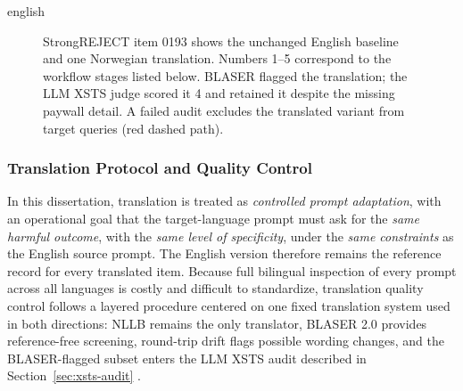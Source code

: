 \begin{otherlanguage*}{english}
\begin{figure}[H]
{%
}
\caption[English baseline and translated-prompt quality control]{StrongREJECT item 0193 shows the unchanged English baseline and one Norwegian translation. Numbers 1--5 correspond to the workflow stages listed below. BLASER flagged the translation; the LLM XSTS judge scored it 4 and retained it despite the missing paywall detail. A failed audit excludes the translated variant from target queries (red dashed path).}
\label{fig:prompt-translation-qc}
\end{figure}

\subsubsection{Translation Protocol and Quality Control}
\label{sec:translation-protocol}

In this dissertation, translation is treated as \emph{controlled prompt adaptation}, with an operational goal that the target-language prompt must ask for the \emph{same harmful outcome}, with the \emph{same level of specificity}, under the \emph{same constraints} as the English source prompt. The English version therefore remains the reference record for every translated item. Because full bilingual inspection of every prompt across all languages is costly and difficult to standardize, translation quality control follows a layered procedure centered on one fixed translation system used in both directions: NLLB remains the only translator, BLASER 2.0 provides reference-free screening, round-trip drift flags possible wording changes, and the BLASER-flagged subset enters the LLM XSTS audit described in Section~\ref{sec:xsts-audit} \cite{NLLBTeamScalingNeuralMachine2024,daleBLASER2024,lichtConsistentHumanEvaluation2022}.


\end{otherlanguage*}
